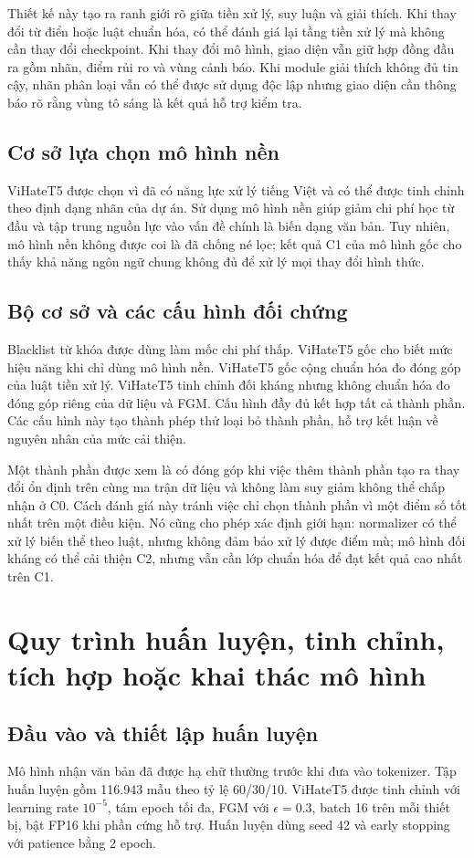 \documentclass[12pt,a4paper]{article}
\begin{document}
Thiết kế này tạo ra ranh giới rõ giữa tiền xử lý, suy luận và giải thích. Khi thay đổi từ điển hoặc luật chuẩn hóa, có thể đánh giá lại tầng tiền xử lý mà không cần thay đổi checkpoint. Khi thay đổi mô hình, giao diện vẫn giữ hợp đồng đầu ra gồm nhãn, điểm rủi ro và vùng cảnh báo. Khi module giải thích không đủ tin cậy, nhãn phân loại vẫn có thể được sử dụng độc lập nhưng giao diện cần thông báo rõ rằng vùng tô sáng là kết quả hỗ trợ kiểm tra.

\subsection{Cơ sở lựa chọn mô hình nền}
ViHateT5 được chọn vì đã có năng lực xử lý tiếng Việt và có thể được tinh chỉnh theo định dạng nhãn của dự án. Sử dụng mô hình nền giúp giảm chi phí học từ đầu và tập trung nguồn lực vào vấn đề chính là biến dạng văn bản. Tuy nhiên, mô hình nền không được coi là đã chống né lọc; kết quả C1 của mô hình gốc cho thấy khả năng ngôn ngữ chung không đủ để xử lý mọi thay đổi hình thức.

\subsection{Bộ cơ sở và các cấu hình đối chứng}
Blacklist từ khóa được dùng làm mốc chi phí thấp. ViHateT5 gốc cho biết mức hiệu năng khi chỉ dùng mô hình nền. ViHateT5 gốc cộng chuẩn hóa đo đóng góp của luật tiền xử lý. ViHateT5 tinh chỉnh đối kháng nhưng không chuẩn hóa đo đóng góp riêng của dữ liệu và FGM. Cấu hình đầy đủ kết hợp tất cả thành phần. Các cấu hình này tạo thành phép thử loại bỏ thành phần, hỗ trợ kết luận về nguyên nhân của mức cải thiện.

Một thành phần được xem là có đóng góp khi việc thêm thành phần tạo ra thay đổi ổn định trên cùng ma trận dữ liệu và không làm suy giảm không thể chấp nhận ở C0. Cách đánh giá này tránh việc chỉ chọn thành phần vì một điểm số tốt nhất trên một điều kiện. Nó cũng cho phép xác định giới hạn: normalizer có thể xử lý biến thể theo luật, nhưng không đảm bảo xử lý được điểm mù; mô hình đối kháng có thể cải thiện C2, nhưng vẫn cần lớp chuẩn hóa để đạt kết quả cao nhất trên C1.

\section{Quy trình huấn luyện, tinh chỉnh, tích hợp hoặc khai thác mô hình}
\subsection{Đầu vào và thiết lập huấn luyện}
Mô hình nhận văn bản đã được hạ chữ thường trước khi đưa vào tokenizer. Tập huấn luyện gồm 116.943 mẫu theo tỷ lệ 60/30/10. ViHateT5 được tinh chỉnh với learning rate $10^{-5}$, tám epoch tối đa, FGM với $\epsilon=0.3$, batch 16 trên mỗi thiết bị, bật FP16 khi phần cứng hỗ trợ. Huấn luyện dùng seed 42 và early stopping với patience bằng 2 epoch.
\end{document}
